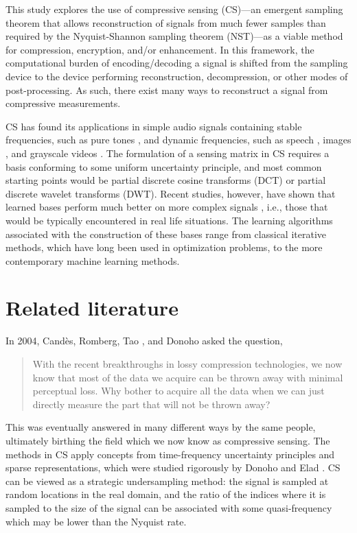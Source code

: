 This study explores the use of compressive sensing (CS)---an emergent sampling theorem that allows reconstruction of signals from much fewer samples than required by the Nyquist-Shannon sampling theorem (NST)---as a viable method for compression, encryption, and/or enhancement. In this framework, the computational burden of encoding/decoding a signal is shifted from the sampling device to the device performing reconstruction, decompression, or other modes of post-processing. As such, there exist many ways to reconstruct a signal from compressive measurements. 

CS has found its applications in simple audio signals containing stable frequencies, such as pure tones \cite{Mathew2016,Andras2018}, and dynamic frequencies, such as speech \cite{Low2013,Low2018,Abrol2015}, images \cite{Mo2013,Zhou2016,Romero2016}, and grayscale videos \cite{Liu2014,Chen2014}. The formulation of a sensing matrix in CS requires a basis conforming to some uniform uncertainty principle, and most common starting points would be partial discrete cosine transforms (DCT) or partial discrete wavelet transforms (DWT). Recent studies, however, have shown that learned bases perform much better on more complex signals \cite{Liu2013,Sharma2018,Eslahi2016}, i.e., those that would be typically encountered in real life situations. The learning algorithms associated with the construction of these bases range from classical iterative methods, which have long been used in optimization problems, to the more contemporary machine learning methods.


\section{Related literature}
\label{sec:rrl}
In 2004, Cand\`{e}s, Romberg, Tao \cite{Candes2006}, and Donoho \cite{Donoho2006} asked the question, 

\begin{quote}
	With the recent breakthroughs in lossy compression technologies, we now know that most of the data we acquire can be thrown away with minimal perceptual loss. Why bother to acquire all the data when we can just directly measure the part that will not be thrown away?
\end{quote}

\noindent This was eventually answered in many different ways by the same people, ultimately birthing the field which we now know as compressive sensing. The methods in CS apply concepts from time-frequency uncertainty principles \cite{Donoho2001} and sparse representations, which were studied rigorously by Donoho and Elad \cite{Donoho2003}. CS can be viewed as a strategic undersampling method: the signal is sampled at random locations in the real domain, and the ratio of the indices where it is sampled to the size of the signal can be associated with some quasi-frequency which may be lower than the Nyquist rate.

